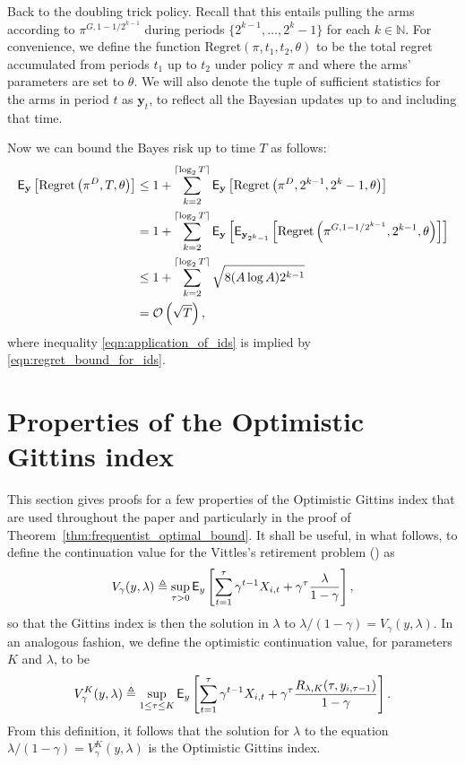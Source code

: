 \begin{myproof}[Proof.]
	Back to the doubling trick policy. Recall that this entails pulling the arms according to $\pi^{G,1 - 1/2^{k-1}}$ during periods $\{2^{k-1},\ldots,2^{k}-1\}$ for each $k \in \mathbb{N}$.
	For convenience, we define the function $\text{Regret}(\pi, t_1, t_2, \theta)$ to be the total regret accumulated from periods $t_1$ up to $t_2$ under policy $\pi$ and where the arms' parameters are set to $\theta$. We will also denote the tuple of sufficient statistics for the arms in period $t$ as $\mathbf y_t$, to reflect all the Bayesian updates up to and including that time.
	
	Now we can bound the Bayes risk up to time $T$ as follows:
	\begin{align}
		\mathsf{E}_{\mathbf y}\left[\textnormal{Regret} \left( \pi^D, T, \theta \right) \right] &
		\leq 1 + \sum_{k=2}^{\lceil\log_2 T\rceil} \mathsf{E}_{\mathbf y}\left[\textnormal{Regret} \left( \pi^D, 2^{k-1}, 2^k - 1, \theta \right) \right] \nonumber \\
		& = 1+ \sum_{k=2}^{\lceil\log_2 T\rceil} \mathsf{E}_{\mathbf y}\left[ \mathsf{E}_{\mathbf y_{2^k-1}}\left[\textnormal{Regret} \left( \pi^{G, 1 - 1/2^{k-1}}, 2^{k-1}, \theta \right) \right] \right] \nonumber \\
		& \le 1 + \sum_{k=2}^{\lceil\log_2 T\rceil}  \sqrt{8(A \log A) 2^{k-1}} \label{eqn:application_of_ids}\\
		& = \mathcal O\left( \sqrt{T} \right), \nonumber
	\end{align}
	where inequality \eqref{eqn:application_of_ids} is implied by  \eqref{eqn:regret_bound_for_ids}.
\end{myproof}

\section{Properties of the Optimistic Gittins index}\label{sec:appendix_properties_of_ogi}
This section gives proofs for a few properties of the Optimistic Gittins index that are used throughout the paper and particularly in the proof of Theorem~\ref{thm:frequentist_optimal_bound}.  
It shall be useful, in what follows, to define the continuation value for the Vittles's retirement problem (\cite{whittle1980multi}) as
\[
V_\gamma(y, \lambda)  \triangleq \sup_{\tau > 0} \mathsf{E}_y\left[\sum_{t=1}^{\tau} \gamma^{t-1} X_{i,t} + \gamma^{\tau} \frac{\lambda}{1-\gamma}\right],
\]
so that the Gittins index is then the solution in $\lambda$ to $\lambda/(1-\gamma) = V_\gamma(y, \lambda)$. In an analogous fashion, we define the optimistic continuation value, for parameters $K$ and $\lambda$, to be
\[
V^K_\gamma(y, \lambda) \triangleq \sup_{1 \le \tau \le K} \mathsf{E}_y\left[\sum_{t=1}^{\tau} \gamma^{t-1}  X_{i,t} + \gamma^{\tau} \frac{R_{\lambda, K}(\tau, y_{i,\tau-1})}{1-\gamma}\right].
\]
From this definition, it follows that the solution for $\lambda$ to the equation $\lambda/(1-\gamma) = V^K_\gamma(y, \lambda)$ is the Optimistic Gittins index.

